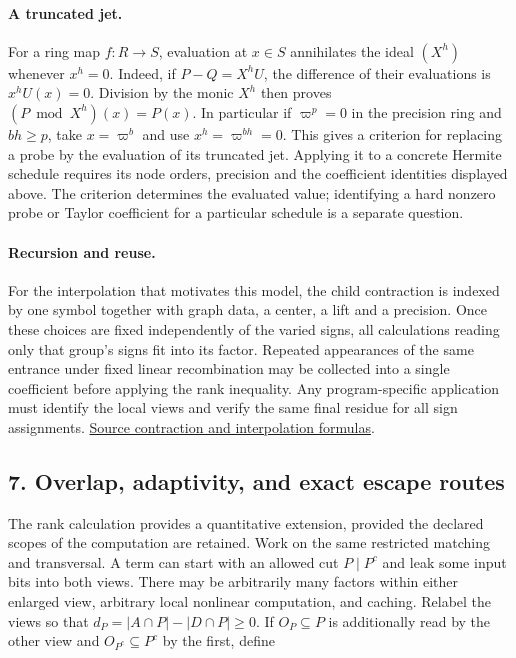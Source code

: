 \documentclass[
  11pt,
]{article}
\begin{document}
\paragraph{A truncated jet.}
For a ring map \(f:R\to S\), evaluation at \(x\in S\) annihilates the
ideal \((X^h)\) whenever \(x^h=0\). Indeed, if
\(P-Q=X^h U\), the difference of their evaluations is \(x^hU(x)=0\).
Division by the monic \(X^h\) then proves
\((P\bmod X^h)(x)=P(x)\). In particular if \(\varpi^p=0\) in the
precision ring and \(bh\ge p\), take \(x=\varpi^b\) and use
\(x^h=\varpi^{bh}=0\). This gives a criterion for replacing a probe
by the evaluation of its truncated jet. Applying it to a concrete
Hermite schedule requires its node orders, precision and the coefficient
identities displayed above. The criterion determines the evaluated
value; identifying a hard nonzero probe or Taylor coefficient for a
particular schedule is a separate question.

\paragraph{Recursion and reuse.}
For the interpolation that motivates this model, the child contraction
is indexed by one symbol together with graph data, a center, a lift and
a precision. Once these choices are fixed independently of the varied
signs, all calculations reading only that group's signs fit into its
factor. Repeated appearances of the same entrance under fixed linear
recombination may be collected into a single coefficient before applying
the rank inequality. Any program-specific application must identify the
local views and verify the same final residue for all sign assignments.
\href{https://github.com/openai/math/blob/main/preprints/The-Exponential-Time-Hypothesis-is-False-October-25-2026/build/quantitative-contraction.tex}{Source contraction and interpolation formulas}.

\subsection{7. Overlap, adaptivity, and exact escape
routes}\label{overlap-adaptivity-and-exact-escape-routes}

The rank calculation provides a quantitative extension, provided the
declared scopes of the computation are retained. Work on the same
restricted matching and transversal. A term can start with an allowed
cut \(P\mid P^c\) and leak some input bits into both views. There may be
arbitrarily many factors within either enlarged view, arbitrary local
nonlinear computation, and caching. Relabel the views so that
\(d_P=|A\cap P|-|D\cap P|\ge0\). If \(O_P\subseteq P\) is additionally
read by the other view and \(O_{P^c}\subseteq P^c\) by the first, define
\end{document}
